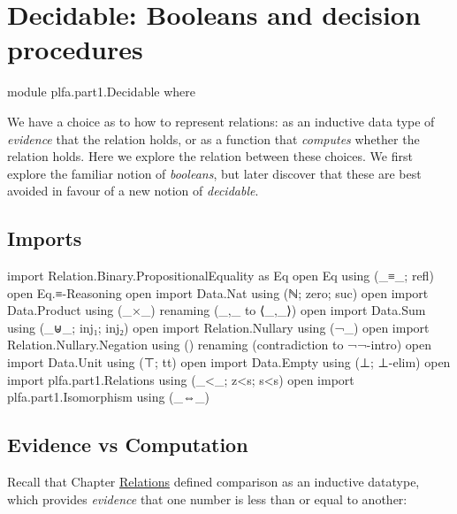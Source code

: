 \hypertarget{Decidable}{%
\chapter{Decidable: Booleans and decision procedures}\label{Decidable}}

\begin{fence}
\begin{code}
module plfa.part1.Decidable where
\end{code}
\end{fence}

We have a choice as to how to represent relations: as an inductive data
type of \emph{evidence} that the relation holds, or as a function that
\emph{computes} whether the relation holds. Here we explore the relation
between these choices. We first explore the familiar notion of
\emph{booleans}, but later discover that these are best avoided in
favour of a new notion of \emph{decidable}.

\hypertarget{imports}{%
\section{Imports}\label{imports}}

\begin{fence}
\begin{code}
import Relation.Binary.PropositionalEquality as Eq
open Eq using (_≡_; refl)
open Eq.≡-Reasoning
open import Data.Nat using (ℕ; zero; suc)
open import Data.Product using (_×_) renaming (_,_ to ⟨_,_⟩)
open import Data.Sum using (_⊎_; inj₁; inj₂)
open import Relation.Nullary using (¬_)
open import Relation.Nullary.Negation using ()
  renaming (contradiction to ¬¬-intro)
open import Data.Unit using (⊤; tt)
open import Data.Empty using (⊥; ⊥-elim)
open import plfa.part1.Relations using (_<_; z<s; s<s)
open import plfa.part1.Isomorphism using (_⇔_)
\end{code}
\end{fence}

\hypertarget{evidence-vs-computation}{%
\section{Evidence vs Computation}\label{evidence-vs-computation}}

Recall that Chapter \protect\hyperlink{Relations}{Relations} defined
comparison as an inductive datatype, which provides \emph{evidence} that
one number is less than or equal to another:

